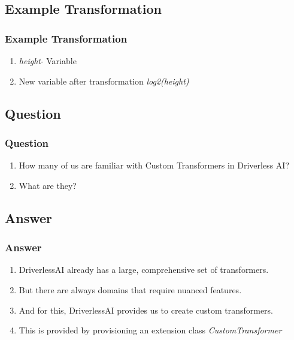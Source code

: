 \documentclass[11pt,
               aspectratio=169,
               hyperref={colorlinks}
               ]{beamer}
\begin{document}
	\subsection{Example Transformation}
	\begin{frame}[fragile]
		\frametitle{Example Transformation}
		\begin{enumerate}
			\item \textit{height}- Variable
			\item New variable after transformation \textit{log2(height)}
		\end{enumerate}
\end{frame}
	\subsection{Question}
	\begin{frame}
		\frametitle{Question}
		\begin{enumerate}
			\item How many of us are familiar with Custom Transformers in Driverless AI?
			\item What are they?
		\end{enumerate}
	\end{frame}
	\subsection{Answer}
	\begin{frame}
		\frametitle{Answer}
		\begin{enumerate}
			\item DriverlessAI already has a large, comprehensive set of transformers. 
			\item But there are always domains that require nuanced features. 
			\item And for this, DriverlessAI provides us to create custom transformers. 
			\item This is provided by provisioning an extension class \textit{CustomTransformer}
		\end{enumerate}
	\end{frame}
\end{document}

